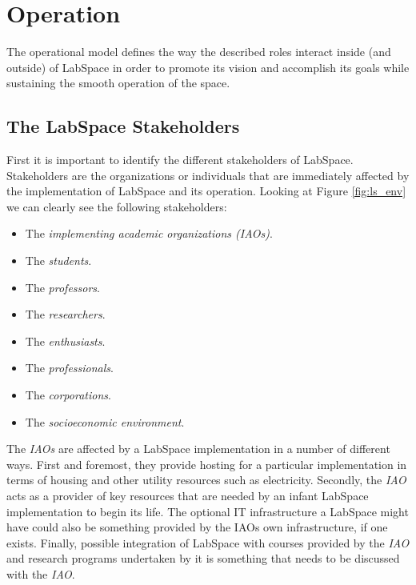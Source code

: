 \documentclass[a4paper, 11pt]{article}
\begin{document}


\section{Operation}

The operational model defines the way the described roles interact inside (and outside) of LabSpace in order to promote its vision and accomplish its goals while sustaining the smooth operation of the space.

\subsection{The LabSpace Stakeholders}
First it is important to identify the different stakeholders of LabSpace. Stakeholders are the organizations or individuals that are immediately affected by the implementation of LabSpace and its operation. Looking at Figure \ref{fig:ls_env} we can clearly see the following stakeholders:

\begin{itemize}[noitemsep]
    \item The \textit{implementing academic organizations (IAOs)}.
    \item The \textit{students}.
    \item The \textit{professors}.
    \item The \textit{researchers}.
    \item The \textit{enthusiasts}.
    \item The \textit{professionals}.
    \item The \textit{corporations}.
    \item The \textit{socioeconomic environment}.
\end{itemize}

The \textit{IAOs} are affected by a LabSpace implementation in a number of different ways. First and foremost, they provide hosting for a particular implementation in terms of housing and other utility resources such as electricity. Secondly, the \textit{IAO} acts as a provider of key resources that are needed by an infant LabSpace implementation to begin its life. The optional IT infrastructure a LabSpace might have could also be something provided by the IAOs own infrastructure, if one exists. Finally, possible integration of LabSpace with courses provided by the \textit{IAO} and research programs undertaken by it is something that needs to be discussed with the \textit{IAO}.
\end{document}
